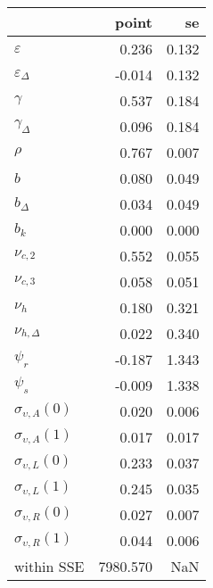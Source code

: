 \begin{tabular}{lrr}
\toprule
{} &     point &     se \\
\midrule
$\varepsilon$            &     0.236 &  0.132 \\
$\varepsilon_{\Delta}$   &    -0.014 &  0.132 \\
$\gamma$                 &     0.537 &  0.184 \\
$\gamma_{\Delta}$        &     0.096 &  0.184 \\
$\rho$                   &     0.767 &  0.007 \\
$b$                      &     0.080 &  0.049 \\
$b_{\Delta}$             &     0.034 &  0.049 \\
$b_k$                    &     0.000 &  0.000 \\
$\nu_{c,2}$              &     0.552 &  0.055 \\
$\nu_{c,3}$              &     0.058 &  0.051 \\
$\nu_{h}$                &     0.180 &  0.321 \\
$\nu_{h,\Delta}$         &     0.022 &  0.340 \\
$\psi_{r}$               &    -0.187 &  1.343 \\
$\psi_{s}$               &    -0.009 &  1.338 \\
$\sigma_{\upsilon,A}(0)$ &     0.020 &  0.006 \\
$\sigma_{\upsilon,A}(1)$ &     0.017 &  0.017 \\
$\sigma_{\upsilon,L}(0)$ &     0.233 &  0.037 \\
$\sigma_{\upsilon,L}(1)$ &     0.245 &  0.035 \\
$\sigma_{\upsilon,R}(0)$ &     0.027 &  0.007 \\
$\sigma_{\upsilon,R}(1)$ &     0.044 &  0.006 \\
within SSE               &  7980.570 &    NaN \\
\bottomrule
\end{tabular}
